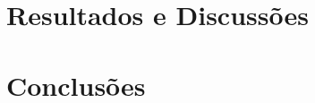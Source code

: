 \documentclass[
    12pt,				%
    oneside,   	        %
    a4paper,			%
    english,			%
    french,				%
    spanish,			%
    brazil,				%
    ]{pacotes/abntex2}
\begin{document}
\section{Resultados e Discussões}
\label{sec:discussao}

\section{Conclusões}
\label{sec:conclusoes}

\postextual
\renewcommand{\bibsection}{%
\section{\bibname}
\bibmark
\prebibhook}


\end{document}

